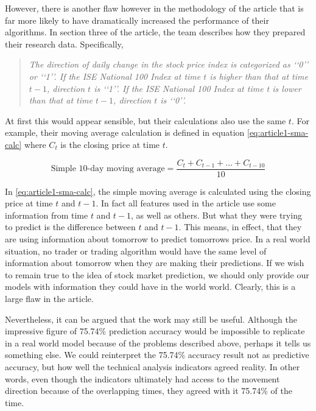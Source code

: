 \documentclass{report}
\begin{document}
However, there is another flaw however in the methodology of the article that is far more likely to have dramatically increased the performance of their algorithms. In section three of the article, the team describes how they prepared their research data. Specifically, 

\begin{quotation}
\textit{The direction of daily change in the stock price index is categorized
as ‘‘0’’ or ‘‘1’’. If the ISE National 100 Index at time $t$ is higher
than that at time $t-1$, direction $t$ is ‘‘1’’. If the ISE National 100
Index at time t is lower than that at time $t-1$, direction $t$ is ‘‘0’’.}
\end{quotation}

At first this would appear sensible, but their calculations also use the same $t$. For example, their moving average calculation is defined in equation \ref{eq:article1-sma-calc} where $C_{t}$ is the closing price at time $t$.

  \begin{figure}[H]
  \begin{center}
      \begin{equation}
        \text{Simple 10-day moving average} = \dfrac
          {C_{t} + C_{t-1} + ... + C_{t-10}} {10}
        \label{eq:article1-sma-calc}
      \end{equation}
  \end{center}
  \end{figure} 

In \ref{eq:article1-sma-calc}, the simple moving average is calculated using the closing price at time $t$ and $t-1$. In fact all features used in the article use some information from time $t$ and $t-1$, as well as others. But what they were trying to predict is the difference between $t$ and $t-1$. This means, in effect, that they are using information about tomorrow to predict tomorrows price. In a real world situation, no trader or trading algorithm would have the same level of information about tomorrow when they are making their predictions. If we wish to remain true to the idea of stock market prediction, we should only provide our models with information they could have in the world world. Clearly, this is a large flaw in the article. 

Nevertheless, it can be argued that the work may still be useful. Although the impressive figure of 75.74\% prediction accuracy would be impossible to replicate in a real world model because of the problems described above, perhaps it tells us something else. We could reinterpret the 75.74\% accuracy result not as predictive accuracy, but how well the technical analysis indicators agreed reality. In other words, even though the indicators ultimately had access to the movement direction because of the overlapping times, they agreed with it 75.74\% of the time. 
\end{document}
